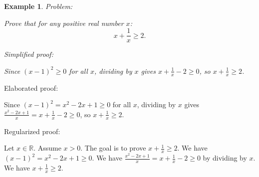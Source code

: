 \documentclass{article}
\newtheorem{example}{Example}
\begin{document}
\begin{example}
Problem:
\begin{tcolorbox}[colback=yellow!10, width=\linewidth]
Prove that for any positive real number $x$:
    $$x + \frac{1}{x} \geq 2.$$
\end{tcolorbox}

Simplified proof:
\begin{tcolorbox}[colback=blue!10, width=\linewidth]
Since $(x-1)^2 \ge 0$ for all $x$, dividing by $x$ gives $x + \frac{1}{x} - 2 \ge 0$, so $x + \frac{1}{x} \ge 2$.
\end{tcolorbox}
\end{example}

Elaborated proof:
\begin{tcolorbox}[colback=green!10, width=\linewidth]
Since $(x-1)^2 = x^2 - 2x + 1 \ge 0$ for all $x$, dividing by $x$ gives $\frac{x^2 - 2x + 1}{x} = x + \frac{1}{x} - 2 \ge 0$, so $x + \frac{1}{x} \ge 2$.
\end{tcolorbox}

Regularized proof:
\begin{tcolorbox}[colback=red!10, width=\linewidth]
Let $x\in\mathbb{R}$. Assume $x>0$.
The goal is to prove $x + \frac{1}{x} \ge 2$.
We have ${\left(x-1\right)}^2 = x^2 - 2x + 1 \ge 0$.
We have $\frac{x^2 - 2x + 1}{x} = x + \frac{1}{x} - 2 \ge 0$ by dividing by $x$.
We have $x + \frac{1}{x} \ge 2$.
\end{tcolorbox}
\end{document}
